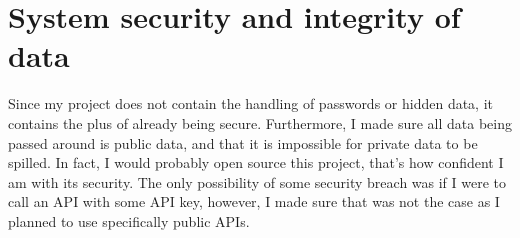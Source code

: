 \newpage
\section{System security and integrity of data}
Since my project does not contain the handling of passwords or hidden data, it contains the plus of already being secure. Furthermore, I made sure all data being passed around is public data, and that it is impossible for private data to be spilled. In fact, I would probably open source this project, that's how confident I am with its security. The only possibility of some security breach was if I were to call an API with some API key, however, I made sure that was not the case as I planned to use specifically public APIs.
